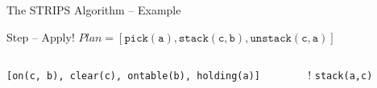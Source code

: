 \documentclass[presentation]{beamer}\mode<presentation>{\usetheme{AMSBolognaFC}}
\begin{document}
\begin{frame}[c]{The STRIPS Algorithm -- Example}
\small

\begin{exampleblock}{Step \nextStripsExampleStep{} -- Apply! \hfill $Plan = [\mathtt{pick(a),stack(c,b),unstack(c,a)}]$}
	\begin{columns}[t]
		\begin{column}{.30\linewidth}\centering
			\texttt{[on(c, b), clear(c), ontable(b), holding(a)]}
		\end{column}
		\begin{column}{.50\linewidth}\centering
			\begin{itemize}
				\item[!] \texttt{stack(a,c)}
			\end{itemize}
		\end{column}
		\begin{column}{.10\linewidth}\centering
			
		\end{column}
	\end{columns}
\end{exampleblock}

\end{frame}



% 			
\end{document}
